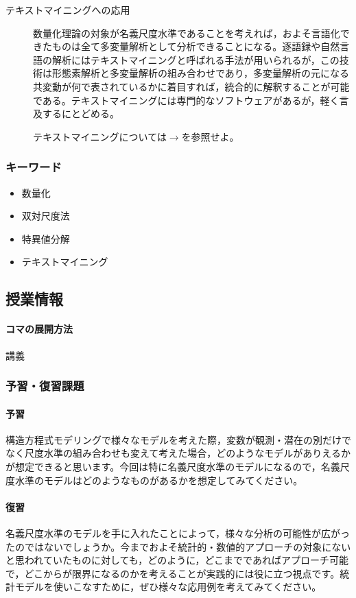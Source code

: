 \begin{description}
    \item[テキストマイニングへの応用] 数量化理論の対象が名義尺度水準であることを考えれば，およそ言語化できたものは全て多変量解析として分析できることになる。逐語録や自然言語の解析にはテキストマイニングと呼ばれる手法が用いられるが，この技術は形態素解析と多変量解析の組み合わせであり，多変量解析の元になる共変動が何で表されているかに着目すれば，統合的に解釈することが可能である。テキストマイニングには専門的なソフトウェアがあるが，軽く言及するにとどめる。
    \begin{flushright}
        テキストマイニングについては$\to$\citet{樋口耕一2020-04-06}を参照せよ。
    \end{flushright}

\end{description}
\subsubsection{キーワード}
\begin{itemize}
    \item 数量化
    \item 双対尺度法
    \item 特異値分解
    \item テキストマイニング
\end{itemize}
\subsection{授業情報}
\paragraph{コマの展開方法}
講義
\subsubsection{予習・復習課題}
\paragraph{予習} 構造方程式モデリングで様々なモデルを考えた際，変数が観測・潜在の別だけでなく尺度水準の組み合わせも変えて考えた場合，どのようなモデルがありえるかが想定できると思います。今回は特に名義尺度水準のモデルになるので，名義尺度水準のモデルはどのようなものがあるかを想定してみてください。
\paragraph{復習} 名義尺度水準のモデルを手に入れたことによって，様々な分析の可能性が広がったのではないでしょうか。今までおよそ統計的・数値的アプローチの対象にないと思われていたものに対しても，どのように，どこまでであればアプローチ可能で，どこからが限界になるのかを考えることが実践的には役に立つ視点です。統計モデルを使いこなすために，ぜひ様々な応用例を考えてみてください。